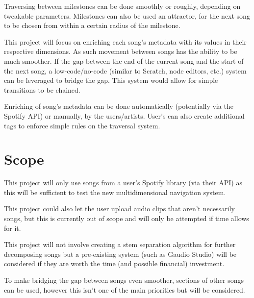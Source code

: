 Traversing between milestones can be done smoothly or roughly, depending on tweakable parameters. Milestones can also be used an attractor, for the next song to be chosen from within a certain radius of the milestone.

This project will focus on enriching each song’s metadata with its values in their respective dimensions. As such movement between songs has the ability to be much smoother. If the gap between the end of the current song and the start of the next song, a low-code/no-code (similar to Scratch, node editors, etc.) system can be leveraged to bridge the gap. This system would allow for simple transitions to be chained.

Enriching of song’s metadata can be done automatically (potentially via the Spotify API) or manually, by the users/artists. User’s can also create additional tags to enforce simple rules on the traversal system.

\section{Scope}

This project will only use songs from a user’s Spotify library (via their API) as this will be sufficient to test the new multidimensional navigation system.

This project could also let the user upload audio clips that aren’t necessarily songs, but this is currently out of scope and will only be attempted if time allows for it.

This project will not involve creating a stem separation algorithm for further decomposing songs but a pre-existing system (such as Gaudio Studio) will be considered if they are worth the time (and possible financial) investment.

To make bridging the gap between songs even smoother, sections of other songs can be used, however this isn’t one of the main priorities but will be considered.